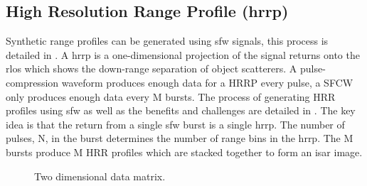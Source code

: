 \documentclass[class=report,11pt,crop=false]{standalone}
\begin{document}
    \subsection{High Resolution Range Profile (\acrshort{hrrp})\label{subsec:theory_hrrp}}
    Synthetic range profiles can be generated using \gls{sfw} signals, this process is detailed in \cite{Wehner1995}.
    A \gls{hrrp} is a one-dimensional projection of the signal returns onto the \gls{rlos} which shows the down-range separation of object scatterers. A pulse-compression waveform produces enough data for a HRRP every pulse, a SFCW only produces enough data every M bursts. The process of generating \gls{HRR} profiles using \gls{sfw} as well as the benefits and challenges are detailed in \cite{Wehner1995}. The key idea is that the return from a single \gls{sfw} burst is a single \gls{hrrp}. The number of pulses, N, in the burst determines the number of range bins in the \gls{hrrp}. The M bursts produce M \gls{HRR} profiles which are stacked together to form an \gls{isar} image.
    
    
    

    \begin{figure}[ht]
        \centering
       \resizebox{0.5\linewidth}{!}{}
        \caption{Two dimensional data matrix.\label{fig:theory_data_matrix}}
    \end{figure} 

\end{document}
